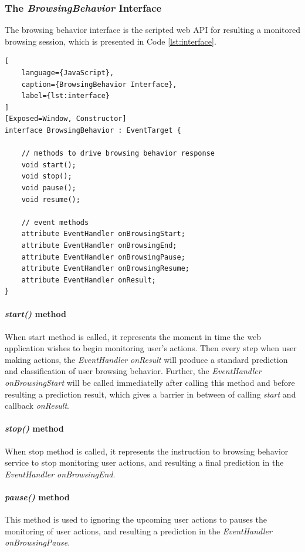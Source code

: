\subsubsection{The \emph{BrowsingBehavior} Interface}

The browsing behavior interface is the scripted web API for resulting a monitored browsing
session, which is presented in Code \ref{lst:interface}.

\begin{lstlisting}[
    language={JavaScript},
    caption={BrowsingBehavior Interface},
    label={lst:interface}
]
[Exposed=Window, Constructor]
interface BrowsingBehavior : EventTarget {
    
    // methods to drive browsing behavior response
    void start();
    void stop();
    void pause();
    void resume();

    // event methods
    attribute EventHandler onBrowsingStart;
    attribute EventHandler onBrowsingEnd;
    attribute EventHandler onBrowsingPause;
    attribute EventHandler onBrowsingResume;
    attribute EventHandler onResult;
}
\end{lstlisting}

\paragraph{\emph{start()} method} When start method is called, it represents the moment in
time the web application wishes to begin monitoring user's actions.
Then every step when user making actions, the \emph{EventHandler onResult} will produce
a standard prediction and classification of user browsing behavior. Further, 
the \emph{EventHandler onBrowsingStart} will be called immediatelly after calling 
this method and before resulting a prediction result, which gives a barrier in between of
calling \emph{start} and callback \emph{onResult}.

\paragraph{\emph{stop()} method} When stop method is called, it represents the instruction
to browsing behavior service to stop monitoring user actions, and resulting a final 
prediction in the \emph{EventHandler onBrowsingEnd}.

\paragraph{\emph{pause()} method} This method is used to ignoring the upcoming user actions
to pauses the monitoring of user actions, and resulting a prediction in the 
\emph{EventHandler onBrowsingPause}.

